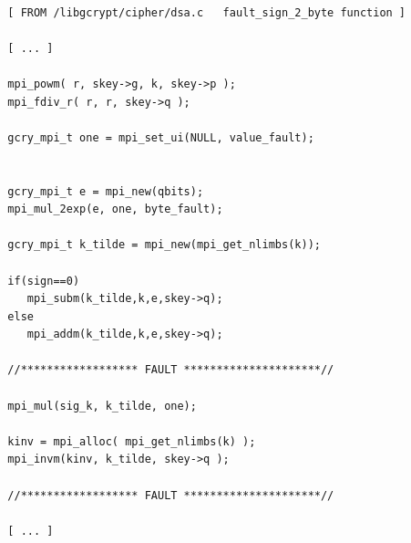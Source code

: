\documentclass[11pt,english]{article}
\begin{document}
\begin {lstlisting}

  [ FROM /libgcrypt/cipher/dsa.c   fault_sign_2_byte function ]
  
  [ ... ]
  
  mpi_powm( r, skey->g, k, skey->p );
  mpi_fdiv_r( r, r, skey->q );

  gcry_mpi_t one = mpi_set_ui(NULL, value_fault);   


  gcry_mpi_t e = mpi_new(qbits);
  mpi_mul_2exp(e, one, byte_fault);   

  gcry_mpi_t k_tilde = mpi_new(mpi_get_nlimbs(k));

  if(sign==0)
     mpi_subm(k_tilde,k,e,skey->q);  
  else
     mpi_addm(k_tilde,k,e,skey->q);

  //****************** FAULT *********************//
  
  mpi_mul(sig_k, k_tilde, one);
  
  kinv = mpi_alloc( mpi_get_nlimbs(k) );
  mpi_invm(kinv, k_tilde, skey->q );

  //****************** FAULT *********************//
  
  [ ... ]

\end{lstlisting}
\end{document}
